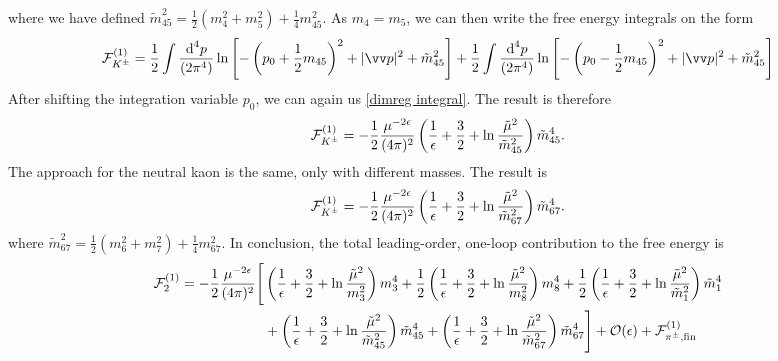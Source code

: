 %
where we have defined 
$
\tilde m_{45}^2 = \frac{1}{2}(m_4^2 + m_5^2) + \frac{1}{4} m_{45}^2.
$
As $m_4 = m_5$, we can then write the free energy integrals on the form
%
\begin{equation} 
    \nonumber
    \Eff_\Kpm^{(1)}
    =
    \frac{1}{2} \int \frac{\dd^4 p}{(2\pi^4)}
    \ln \left[
        - \left(p_0 + \frac{1}{2}m_{45}\right)^2 
        + |\vv p|^2 
        + \tilde m_{45}^2 
    \right]
    +
    \frac{1}{2}
    \int \frac{\dd^4 p}{(2\pi^4)}
    \ln \left[
        - \left(p_0 - \frac{1}{2}m_{45}\right)^2 
        + |\vv p|^2 
        + \tilde m_{45}^2 
    \right]
\end{equation}
%
After shifting the integration variable $p_0$, we can again us \autoref{dimreg integral}.
The result is therefore
%
\begin{equation}
    \mathcal{F}_{K^\pm}^{(1)}
    =
    - \frac{1}{2} \frac{\mu^{-2 \epsilon} }{(4\pi)^2} 
    \left(
        \frac{1}{\epsilon} + \frac{3}{2} + \ln \frac{\tilde \mu^2}{\tilde m_{45}^2}
    \right)\tilde m_{45}^4.
\end{equation}
%
The approach for the neutral kaon is the same, only with different masses.
The result is
%
\begin{equation}
    \mathcal{F}_{K^\pm}^{(1)}
    =
    - \frac{1}{2} \frac{ \mu^{-2 \epsilon}}{(4\pi)^2} 
    \left(
        \frac{1}{\epsilon} + \frac{3}{2} + \ln \frac{\tilde \mu^2}{\tilde m_{67}^2}
    \right)\tilde m_{67}^4.
\end{equation}
%
where
$
\tilde m_{67}^2 = \frac{1}{2}(m_6^2 + m_7^2) + \frac{1}{4} m_{67}^2.
$
In conclusion, the total leading-order, one-loop contribution to the free energy is
%
\begin{align}
    \label{one-loop free energy}
    \nonumber
    \mathcal{F}^{(1)}_2
    =
    -\frac{1}{2} \frac{  \mu^{-2\epsilon}}{(4 \pi)^2} 
    \Bigg[&
        \left(
            \frac{1}{\epsilon} + \frac{3}{2} + \ln\frac{\tilde \mu^2}{m_3^2}
        \right)
        m_3^4
        +
        \frac{1}{2}
        \left(
            \frac{1}{\epsilon} + \frac{3}{2} + \ln\frac{\tilde \mu^2}{m_8^2} 
        \right)
        m_8^4+
        \frac{1}{2}
        \left(
            \frac{1}{\epsilon} + \frac{3}{2} + \ln\frac{\tilde \mu^2}{\tilde m_1^2}
        \right)
        \tilde m_1^4 \\ \nonumber
        & +
        \left(
            \frac{1}{\epsilon} + \frac{3}{2} + \ln\frac{\tilde \mu^2}{\tilde m_{45}^2}
        \right)
        \tilde m_{45}^4
        +
        \left(
            \frac{1}{\epsilon} + \frac{3}{2} + \ln\frac{\tilde \mu^2}{\tilde m_{67}^2} 
        \right)
        \tilde m_{67}^4
    \Bigg]
    + \mathcal O(\epsilon)
    + \mathcal{F}^{(1)}_{{\pi^\pm},\text{fin}}
\end{align}


